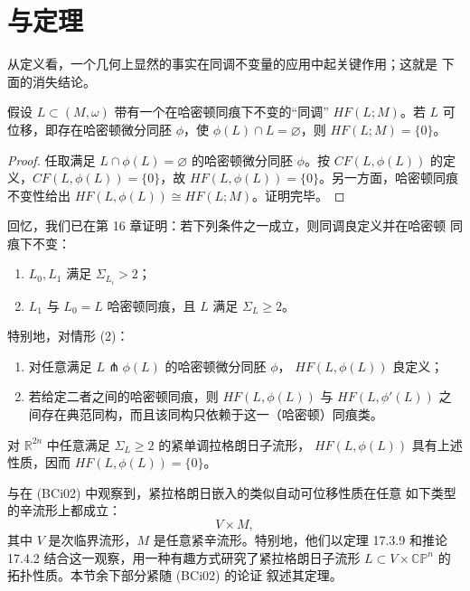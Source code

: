 \section{\personBiran{}与\personCieliebak{}定理}
\label{sec:biran-cieliebak-theorem}

从定义看，一个几何上显然的事实在\personFloer{}同调不变量的应用中起关键作用；这就是
下面的消失结论。

\begin{theorem}
\label{thm:displaceable-floer-vanishes}
假设 $L\subset(M,\omega)$ 带有一个在哈密顿同痕下不变的“\personFloer{}同调”
$HF(L;M)$。若 $L$ 可位移，即存在哈密顿微分同胚 $\phi$，使
$\phi(L)\cap L=\varnothing$，则 $HF(L;M)=\{0\}$。
\end{theorem}

\begin{proof}
任取满足 $L\cap\phi(L)=\varnothing$ 的哈密顿微分同胚 $\phi$。按
$CF(L,\phi(L))$ 的定义，$CF(L,\phi(L))=\{0\}$，故
$HF(L,\phi(L))=\{0\}$。另一方面，哈密顿同痕不变性给出
$HF(L,\phi(L))\cong HF(L;M)$。证明完毕。
\end{proof}

回忆，我们已在第 16 章证明：若下列条件之一成立，则\personFloer{}同调良定义并在哈密顿
同痕下不变：
\begin{enumerate}[label=(\arabic*)]
\item $L_0,L_1$ 满足 $\Sigma_{L_i}>2$；
\item $L_1$ 与 $L_0=L$ 哈密顿同痕，且 $L$ 满足 $\Sigma_L\geq2$。
\end{enumerate}
特别地，对情形 (2)：
\begin{enumerate}[label=(\arabic*)]
\item 对任意满足 $L\pitchfork\phi(L)$ 的哈密顿微分同胚 $\phi$，
$HF(L,\phi(L))$ 良定义；
\item 若给定二者之间的哈密顿同痕，则 $HF(L,\phi(L))$ 与
$HF(L,\phi'(L))$ 之间存在典范同构，而且该同构只依赖于这一（哈密顿）同痕类。
\end{enumerate}

\begin{corollary}
\label{cor:monotone-lagrangian-R2n-HF-zero}
对 $\mathbb R^{2n}$ 中任意满足 $\Sigma_L\geq2$ 的紧单调拉格朗日子流形，
$HF(L,\phi(L))$ 具有上述性质，因而 $HF(L,\phi(L))=\{0\}$。
\end{corollary}

\personBiran{}与\personCieliebak{}在 (BCi02) 中观察到，紧拉格朗日嵌入的类似自动可位移性质在任意
如下类型的辛流形上都成立：
\begin{equation}
 V\times M,
\label{eq:17-subcritical-product}
\end{equation}
其中 $V$ 是次临界\personWeinstein{}流形，$M$ 是任意紧辛流形。特别地，他们以定理
17.3.9 和推论 17.4.2 结合这一观察，用一种有趣方式研究了紧拉格朗日子流形
$L\subset V\times\mathbb{CP}^n$ 的拓扑性质。本节余下部分紧随 (BCi02) 的论证
叙述其定理。

